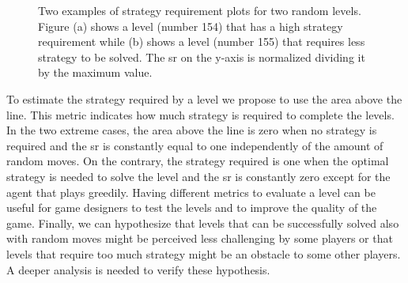 \begin{figure}[h]
  \centering
    
    \caption{Two examples of strategy requirement plots for two random levels. Figure (a) shows a level (number 154) that has a high strategy requirement while (b) shows a level (number 155) that requires less strategy to be solved. The \acs{sr} on the y-axis is normalized dividing it by the maximum value.}
    \label{fig:two_levels_strategy}
\end{figure}
To estimate the strategy required by a level we propose to use the area above the line. This metric indicates how much strategy is required to complete the levels. In the two extreme cases, the area above the line is zero when no strategy is required and the \acs{sr} is constantly equal to one independently of the amount of random moves. On the contrary, the strategy required is one when the optimal strategy is needed to solve the level and the \acs{sr} is constantly zero except for the agent that plays greedily. Having different metrics to evaluate a level can be useful for game designers to test the levels and to improve the quality of the game. Finally, we can hypothesize that levels that can be successfully solved also with random moves might be perceived less challenging by some players or that levels that require too much strategy might be an obstacle to some other players. A deeper analysis is needed to verify these hypothesis. 

